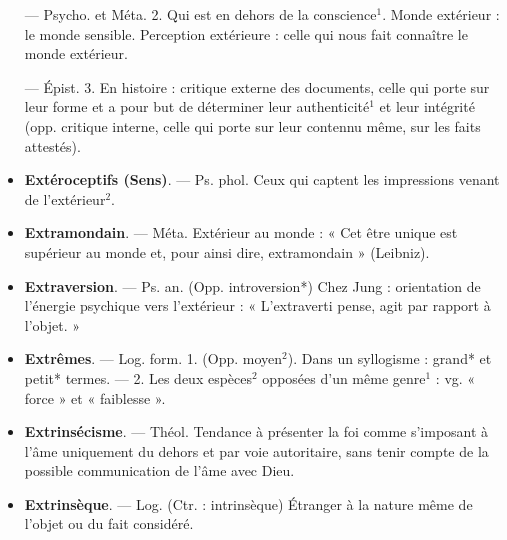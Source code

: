 \begin{itemize}[leftmargin=1cm, label=, itemsep=1pt]
— Psycho. et Méta. 2. Qui est en
dehors de la conscience$^1$. Monde
extérieur : le monde sensible. Perception extérieure : celle qui nous fait
connaître le monde extérieur.

— Épist. 3. En histoire : critique
externe des documents, celle qui
porte sur leur forme et a pour but
de déterminer leur authenticité$^1$ et
leur intégrité (opp. critique interne,
celle qui porte sur leur contennu
même, sur les faits attestés).

\item {\bf Extéroceptifs (Sens)}. — Ps. phol.
Ceux qui captent les impressions
venant de l’extérieur$^2$.

\item {\bf Extramondain}. — Méta. Extérieur au
monde : « Cet être unique est supérieur au monde et, pour ainsi dire,
extramondain » (Leibniz).

\item {\bf Extraversion}. — Ps. an. (Opp.
introversion*) Chez Jung : orientation de l'énergie psychique vers
l'extérieur : « L’extraverti pense,
agit par rapport à l’objet. »

\item {\bf Extrêmes}. — Log. form. 1. (Opp.
moyen$^2$). Dans un syllogisme : grand*
et petit* termes. — 2. Les deux
espèces$^2$ opposées d’un même genre$^1$ :
vg. « force » et « faiblesse ».

\item {\bf Extrinsécisme}. — Théol. Tendance à
présenter la foi comme s'imposant à
l’âme uniquement du dehors et par
voie autoritaire, sans tenir compte de
la possible communication de l’âme
avec Dieu.

\item {\bf Extrinsèque}. — Log. (Ctr. :
intrinsèque) Étranger à la nature même
de l’objet ou du fait considéré.

	\end{itemize}
